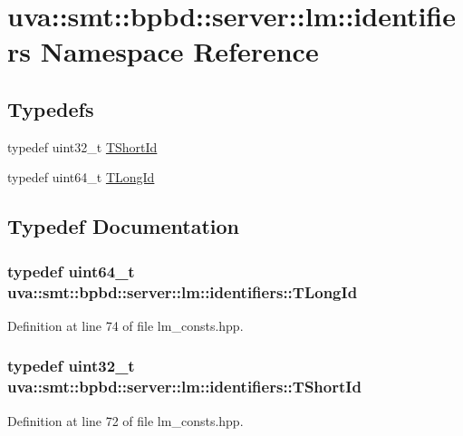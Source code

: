 \hypertarget{namespaceuva_1_1smt_1_1bpbd_1_1server_1_1lm_1_1identifiers}{}\section{uva\+:\+:smt\+:\+:bpbd\+:\+:server\+:\+:lm\+:\+:identifiers Namespace Reference}
\label{namespaceuva_1_1smt_1_1bpbd_1_1server_1_1lm_1_1identifiers}
\subsection*{Typedefs}
\begin{DoxyCompactItemize}
\item 
typedef uint32\+\_\+t \hyperlink{namespaceuva_1_1smt_1_1bpbd_1_1server_1_1lm_1_1identifiers_a33043a191e9a637dea742a89d23c8bdc}{T\+Short\+Id}
\item 
typedef uint64\+\_\+t \hyperlink{namespaceuva_1_1smt_1_1bpbd_1_1server_1_1lm_1_1identifiers_a6841847096e455ad3c38689bc548b3b0}{T\+Long\+Id}
\end{DoxyCompactItemize}


\subsection{Typedef Documentation}
\hypertarget{namespaceuva_1_1smt_1_1bpbd_1_1server_1_1lm_1_1identifiers_a6841847096e455ad3c38689bc548b3b0}{}
\subsubsection[{T\+Long\+Id}]{\setlength{\rightskip}{0pt plus 5cm}typedef uint64\+\_\+t {\bf uva\+::smt\+::bpbd\+::server\+::lm\+::identifiers\+::\+T\+Long\+Id}}\label{namespaceuva_1_1smt_1_1bpbd_1_1server_1_1lm_1_1identifiers_a6841847096e455ad3c38689bc548b3b0}


Definition at line 74 of file lm\+\_\+consts.\+hpp.

\hypertarget{namespaceuva_1_1smt_1_1bpbd_1_1server_1_1lm_1_1identifiers_a33043a191e9a637dea742a89d23c8bdc}{}
\subsubsection[{T\+Short\+Id}]{\setlength{\rightskip}{0pt plus 5cm}typedef uint32\+\_\+t {\bf uva\+::smt\+::bpbd\+::server\+::lm\+::identifiers\+::\+T\+Short\+Id}}\label{namespaceuva_1_1smt_1_1bpbd_1_1server_1_1lm_1_1identifiers_a33043a191e9a637dea742a89d23c8bdc}


Definition at line 72 of file lm\+\_\+consts.\+hpp.

